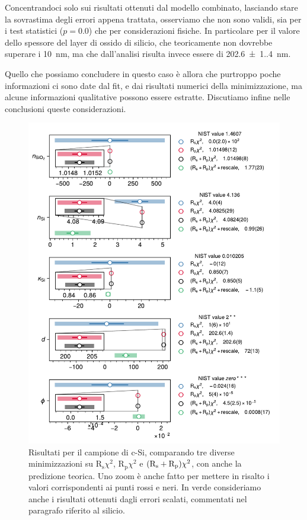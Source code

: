 \documentclass[
    prb,altaffilletter,citeautoscript,
    amsmath,amssymb,
    showpacs,showkeys,floatfix,
    reprint
]{revtex4-1}
\begin{document}
Concentrandoci solo sui risultati ottenuti dal modello combinato, lasciando stare la sovrastima degli errori appena trattata, osserviamo che non sono validi, sia per i test statistici ($p=0.0$) che per considerazioni fisiche. In particolare per il valore dello spessore del layer di ossido di silicio, che teoricamente non dovrebbe superare i \SI{10}{\nano\metre}, ma che dall'analisi risulta invece essere di \SI{202.6(1.4)}{\nano\metre}. 

Quello che possiamo concludere in questo caso è allora che purtroppo poche informazioni ci sono date dal fit, e dai risultati numerici della minimizzazione, ma alcune informazioni qualitative possono essere estratte. Discutiamo infine nelle conclusioni queste considerazioni.

\begin{figure}
    \centering
    \includegraphics[width=\linewidth]{figures/Si_results_all.pdf}
    \caption{Risultati per il campione di c-Si, comparando tre diverse minimizzazioni su $\mathrm{R_s}\chi^2$, $\mathrm{R_p}\chi^2$ e $\qty(\mathrm{R_s}+ \mathrm{R_p})\chi^2$, con anche la predizione teorica. Uno zoom è anche fatto per mettere in risalto i valori corrispondenti ai punti rossi e neri. In verde consideriamo anche i risultati ottenuti dagli errori scalati, commentati nel paragrafo riferito al silicio.}
    \label{fig:Si_result_all}
\end{figure}
\end{document}
